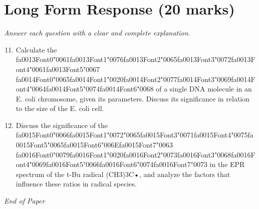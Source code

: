 \documentclass[12pt]{article}
\begin{document}
\section*{Long Form Response (20 marks)}
\textit{Answer each question with a clear and complete explanation.}
\begin{enumerate}[label=\arabic*.]
\setcounter{enumi}{10}
\item Calculate the {\csname fa0013Font0\endcsname\char"0061}{\csname fa0013Font1\endcsname\char"0076}{\csname fa0013Font2\endcsname\char"0065}{\csname fa0013Font3\endcsname\char"0072}{\csname fa0013Font4\endcsname\char"0061}{\csname fa0013Font5\endcsname\char"0067} {\csname fa0014Font0\endcsname\char"0065}{\csname fa0014Font1\endcsname\char"0020}{\csname fa0014Font2\endcsname\char"0077}{\csname fa0014Font3\endcsname\char"0069}{\csname fa0014Font4\endcsname\char"0064}{\csname fa0014Font5\endcsname\char"0074}{\csname fa0014Font6\endcsname\char"0068} of a single DNA molecule in an E. coli chromosome, given its
parameters. Discuss its significance in relation to the size of the E. coli cell.
\item Discuss the significance of the {\csname fa0015Font0\endcsname\char"0066}{\csname fa0015Font1\endcsname\char"0072}{\char"0065}{\csname fa0015Font3\endcsname\char"0071}{\csname fa0015Font4\endcsname\char"0075}{\csname fa0015Font5\endcsname\char"0065}{\csname fa0015Font6\endcsname\char"006E}{\csname fa0015Font7\endcsname\char"0063} {\csname fa0016Font0\endcsname\char"0079}{\csname fa0016Font1\endcsname\char"0020}{\csname fa0016Font2\endcsname\char"0073}{\csname fa0016Font3\endcsname\char"0068}{\csname fa0016Font4\endcsname\char"0069}{\csname fa0016Font5\endcsname\char"0066}{\csname fa0016Font6\endcsname\char"0074}{\csname fa0016Font7\endcsname\char"0073} in the EPR spectrum of the t-Bu radical
(CH3)3C•, and analyze the factors that influence these ratios in radical species.
\end{enumerate}

\vfill
\noindent\textit{End of Paper}
\end{document}

